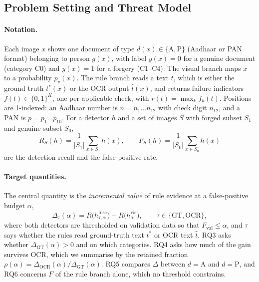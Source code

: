 \documentclass[conference]{IEEEtran}
\begin{document}
\subsection{Problem Setting and Threat Model}
\label{subsec:problem}

\paragraph*{Notation.} Each image $x$ shows one document of type
$d(x)\in\{\mathrm{A},\mathrm{P}\}$ (Aadhaar or PAN format) belonging to
person $g(x)$, with label $y(x)=0$ for a genuine document (category C0)
and $y(x)=1$ for a forgery (C1--C4). The visual branch maps $x$ to a
probability $p_v(x)$. The rule branch reads a text $t$, which is either
the ground truth $t^{\ast}(x)$ or the OCR output $\hat{t}(x)$, and
returns failure indicators $f(t)\in\{0,1\}^{K}$, one per applicable
check, with $r(t)=\max_k f_k(t)$. Positions are 1-indexed: an Aadhaar
number is $n=n_1\dots n_{12}$ with check digit $n_{12}$, and a PAN is
$p=p_1\dots p_{10}$. For a detector $h$ and a set of images $S$ with
forged subset $S_1$ and genuine subset $S_0$,
\begin{equation}
\label{eq:rates}
R_S(h)=\frac{1}{|S_1|}\sum_{x\in S_1} h(x),\qquad
F_S(h)=\frac{1}{|S_0|}\sum_{x\in S_0} h(x)
\end{equation}
are the detection recall and the false-positive rate.

\paragraph*{Target quantities.} The central quantity is the
\emph{incremental value} of rule evidence at a false-positive budget
$\alpha$,
\begin{equation}
\label{eq:delta}
\Delta_{\tau}(\alpha) = R\big(h^{\mathrm{fuse}}_{\tau,\alpha}\big) - R\big(h^{\mathrm{vis}}_{\alpha}\big),
\qquad \tau\in\{\mathrm{GT},\mathrm{OCR}\},
\end{equation}
where both detectors are thresholded on validation data so that
$F_{\mathrm{val}}\le\alpha$, and $\tau$ says whether the rules read
ground-truth text $t^{\ast}$ or OCR text $\hat{t}$. RQ3 asks whether
$\Delta_{\mathrm{GT}}(\alpha)>0$
and on which categories. RQ4 asks how much of the gain survives OCR,
which we summarise by the retained fraction
$\rho(\alpha)=\Delta_{\mathrm{OCR}}(\alpha)/\Delta_{\mathrm{GT}}(\alpha)$. RQ5
compares $\Delta$ between $d=\mathrm{A}$ and $d=\mathrm{P}$, and RQ6
concerns $F$ of the rule branch alone, which no threshold constrains.
\end{document}

